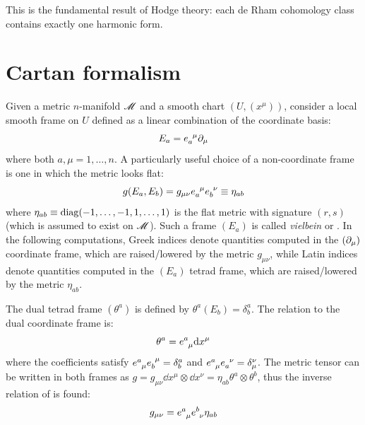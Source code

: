 This is the fundamental result of Hodge theory: each de Rham cohomology class contains exactly one harmonic form.

\section{Cartan formalism}

Given a metric $ n $-manifold $ \mathscr{M} $ and a smooth chart $ (U , (x^\mu)) $, consider a local smooth frame on $ U $ defined as a linear combination of the coordinate basis:
\begin{equation}
  E_a = \tensor{e}{_a^\mu} \pa_\mu
\end{equation}
where both $ a,\mu = 1 , \dots , n $. A particularly useful choice of a non-coordinate frame is one in which the metric looks flat:
\begin{equation}
  g(E_a, E_b) = g_{\mu \nu} \tensor{e}{_a^\mu} \tensor{e}{_b^\nu} \equiv \eta_{ab}
  \label{eq:vielbeins-def}
\end{equation}
where $ \eta_{ab} \equiv \operatorname{diag}(-1 , \dots , -1 , 1 , \dots , 1) $ is the flat metric with signature $ (r,s) $ (which is assumed to exist on $ \mathscr{M} $).
Such a frame $ (E_a) $ is called \emph{vielbein} or . In the following computations, Greek indices denote quantities computed in the $ (\partial_\mu) $ coordinate frame, which are raised/lowered by the metric $ g_{\mu \nu} $, while Latin indices denote quantities computed in the $ (E_a) $ tetrad frame, which are raised/lowered by the metric $ \eta_{ab} $.

The dual tetrad frame $ (\theta^a) $ is defined by $ \theta^a(E_b) = \delta^a_b $. The relation to the dual coordinate frame is:
\begin{equation}
  \theta^a = \tensor{e}{^a_\mu} \dd x^\mu
\end{equation}
where the coefficients satisfy $ \tensor{e}{^a_\mu} \tensor{e}{_b^\mu} = \delta^a_b $ and $ \tensor{e}{^a_\mu} \tensor{e}{_a^\nu} = \delta_\mu^\nu $.
The metric tensor can be written in both frames as $ g = g_{\mu \nu} \dd x^\mu \otimes \dd x^\nu = \eta_{ab} \theta^a \otimes \theta^b $, thus the inverse relation of  is found:
\begin{equation}
  g_{\mu \nu} = \tensor{e}{^a_\mu} \tensor{e}{^b_\nu} \eta_{ab}
\end{equation}

